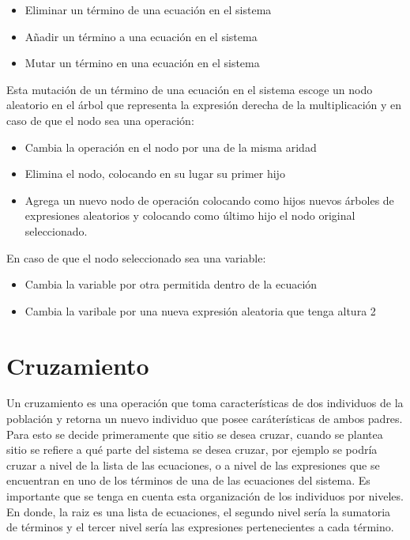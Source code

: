 \begin{itemize}
    \item Eliminar un término de una ecuación en el sistema
    \item Añadir un término a una ecuación en el sistema
    \item Mutar un término en una ecuación en el sistema
\end{itemize}

Esta mutación de un término de una ecuación en el sistema escoge un nodo aleatorio en el árbol que representa la expresión derecha de la multiplicación y en caso de que el nodo sea una operación:

\begin{itemize}
    \item Cambia la operación en el nodo por una de la misma aridad
    \item Elimina el nodo, colocando en su lugar su primer hijo
    \item Agrega un nuevo nodo de operación colocando como hijos nuevos árboles de expresiones aleatorios y colocando como último hijo el nodo original seleccionado.
\end{itemize}

En caso de que el nodo seleccionado sea una variable:

\begin{itemize}
    \item Cambia la variable por otra permitida dentro de la ecuación
    \item Cambia la varibale por una nueva expresión aleatoria que tenga altura 2
\end{itemize}


\section{Cruzamiento}

Un cruzamiento es una operación que toma características de dos individuos de la población y retorna un nuevo individuo que posee caráterísticas de ambos padres. Para esto se decide primeramente que sitio se desea cruzar, cuando se plantea sitio se refiere a qué parte del sistema se desea cruzar, por ejemplo se podría cruzar a nivel de la lista de las ecuaciones, o a nivel de las expresiones que se encuentran en uno de los términos de una de las ecuaciones del sistema. Es importante que se tenga en cuenta esta organización de los individuos por niveles. En donde, la raiz es una lista de ecuaciones, el segundo nivel sería la sumatoria de términos y el tercer nivel sería las expresiones pertenecientes a cada término.

